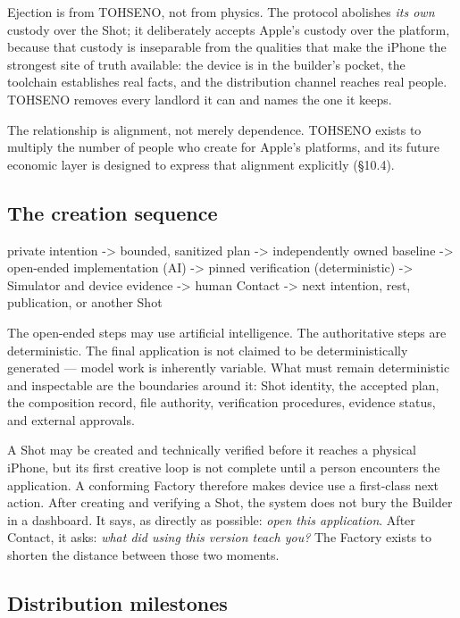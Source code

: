 \documentclass[11pt]{article}
\newcommand{\TOH}{TOHSENO}
\begin{document}
Ejection is from \TOH{}, not from physics. The protocol abolishes
\emph{its own} custody over the Shot; it deliberately accepts Apple's
custody over the platform, because that custody is inseparable from the
qualities that make the iPhone the strongest site of truth available:
the device is in the builder's pocket, the toolchain establishes real
facts, and the distribution channel reaches real people. \TOH{} removes
every landlord it can and names the one it keeps.

The relationship is alignment, not merely dependence. \TOH{} exists to
multiply the number of people who create for Apple's platforms, and its
future economic layer is designed to express that alignment explicitly
(§10.4).

\subsection{The creation sequence}

\begin{proto}
private intention
  -> bounded, sanitized plan
  -> independently owned baseline
  -> open-ended implementation (AI)
  -> pinned verification (deterministic)
  -> Simulator and device evidence
  -> human Contact
  -> next intention, rest, publication, or another Shot
\end{proto}

The open-ended steps may use artificial intelligence. The authoritative
steps are deterministic. The final application is not claimed to be
deterministically generated --- model work is inherently variable. What
must remain deterministic and inspectable are the boundaries around it:
Shot identity, the accepted plan, the composition record, file
authority, verification procedures, evidence status, and external
approvals.

A Shot may be created and technically verified before it reaches a
physical iPhone, but its first creative loop is not complete until a
person encounters the application. A conforming Factory therefore makes
device use a first-class next action. After creating and verifying a
Shot, the system does not bury the Builder in a dashboard. It says, as
directly as possible: \emph{open this application}. After Contact, it
asks: \emph{what did using this version teach you?} The Factory exists
to shorten the distance between those two moments.

\subsection{Distribution milestones}
\end{document}
